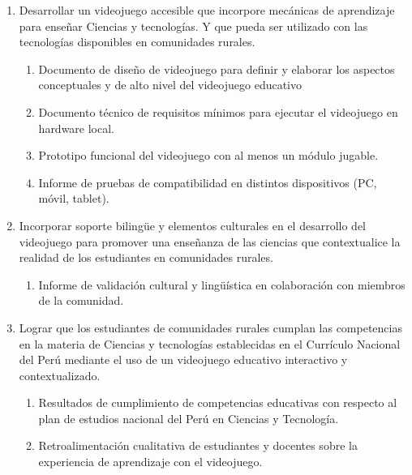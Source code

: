 \begin{enumerate}[label=O\arabic*.,itemsep=5pt]
    \item Desarrollar un videojuego accesible que incorpore mecánicas de aprendizaje para enseñar Ciencias y tecnologías. Y que pueda ser utilizado con las tecnologías disponibles en comunidades rurales.
    
    \begin{enumerate}[label=R\arabic{enumi}.\arabic*.]
        \item Documento de diseño de videojuego para definir y elaborar los aspectos conceptuales y de alto nivel del videojuego educativo
        \item Documento técnico de requisitos mínimos para ejecutar el videojuego en hardware local.
        \item Prototipo funcional del videojuego con al menos un módulo jugable.
        \item Informe de pruebas de compatibilidad en distintos dispositivos (PC, móvil, tablet).
    \end{enumerate}
    \item Incorporar soporte bilingüe y elementos culturales en el desarrollo del videojuego para promover una enseñanza de las ciencias que contextualice la realidad de los estudiantes en comunidades rurales.
    
    \begin{enumerate}[label=R\arabic{enumi}.\arabic*.]
        
        \item Informe de validación cultural y lingüística en colaboración con miembros de la comunidad.
    \end{enumerate}

    \item Lograr que los estudiantes de comunidades rurales cumplan las competencias en la materia de Ciencias y tecnologías establecidas en el Currículo Nacional del Perú mediante el uso de un videojuego educativo interactivo y contextualizado.
    
    \begin{enumerate}[label=R\arabic{enumi}.\arabic*.]
        \item Resultados de cumplimiento de competencias educativas con respecto al plan de estudios nacional del Perú en Ciencias y Tecnología.
        \item Retroalimentación cualitativa de estudiantes y docentes sobre la experiencia de aprendizaje con el videojuego.
    \end{enumerate}
\end{enumerate}

